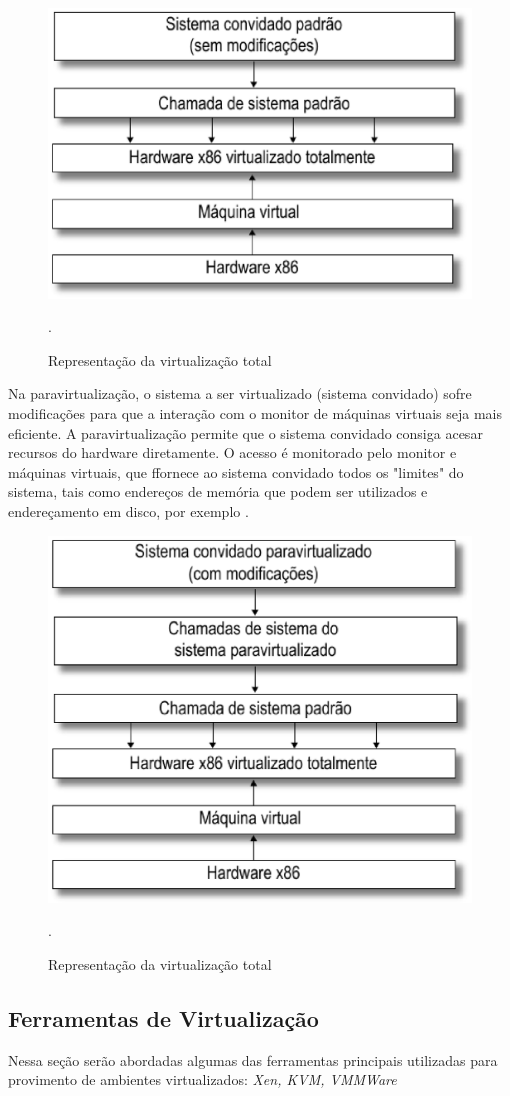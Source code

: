 \begin{figure}[!htb]
\centering
\includegraphics [keepaspectratio=true,scale=0.40]{figuras/full_virtualization.eps}
\caption{Representação da virtualização total}
\cite{marcos}.
\label{full_virtualization}
\end{figure}

Na paravirtualização, o sistema a ser virtualizado (sistema convidado) sofre modificações para que a interação com o monitor de máquinas virtuais seja mais eficiente. A paravirtualização permite que o sistema convidado consiga acesar recursos do hardware diretamente. O acesso é monitorado pelo monitor e máquinas virtuais, que ffornece ao sistema convidado todos os "limites" do sistema, tais como endereços de memória que podem ser utilizados e endereçamento em disco, por exemplo \cite{marcos}.

\begin{figure}[!htb]
\centering
\includegraphics [keepaspectratio=true,scale=0.40]{figuras/paravirtualization.eps}
\caption{Representação da virtualização total}
\cite{marcos}.
\label{paravirtualization}
\end{figure}

\subsection{Ferramentas de Virtualização}
Nessa seção serão abordadas algumas das ferramentas principais utilizadas para provimento de ambientes virtualizados: \textit{Xen, KVM, VMMWare}
